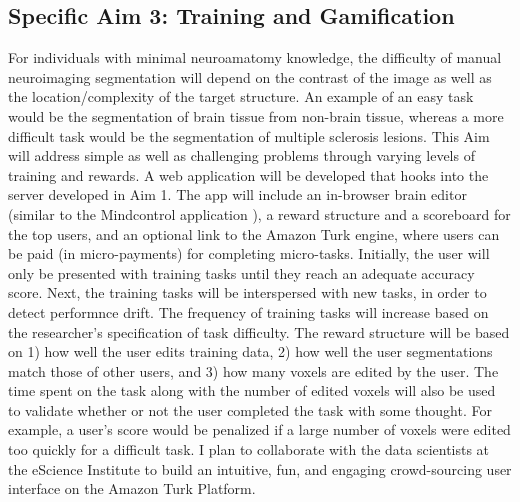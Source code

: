

\subsection*{Specific Aim 3: Training and Gamification}

For individuals with minimal neuroamatomy knowledge, the difficulty of manual neuroimaging segmentation will depend on the contrast of the image as well as the location/complexity of the target structure. An example of an easy task would be the segmentation of brain tissue from non-brain tissue, whereas a more difficult task would be the segmentation of multiple sclerosis lesions. This Aim will address simple as well as challenging problems through varying levels of training and rewards. A web application will be developed that hooks into the server developed in Aim 1. The app will include an in-browser brain editor (similar to the Mindcontrol application \cite{keshavan2016mindcontrol}), a reward structure and a scoreboard for the top users, and an optional link to the Amazon Turk engine, where users can be paid (in micro-payments) for completing micro-tasks. Initially, the user will only be presented with training tasks until they reach an adequate accuracy score. Next, the training tasks will be interspersed with new tasks, in order to detect performnce drift. The frequency of training tasks will increase based on the researcher's specification of task difficulty. The reward structure will be based on 1) how well the user edits training data, 2) how well the user segmentations match those of other users, and 3) how many voxels are edited by the user. The time spent on the task along with the number of edited voxels will also be used to validate whether or not the user completed the task with some thought. For example, a user's score would be penalized if a large number of voxels were edited too quickly for a difficult task. I plan to collaborate with the data scientists at the eScience Institute to build an intuitive, fun, and engaging crowd-sourcing user interface on the Amazon Turk Platform.